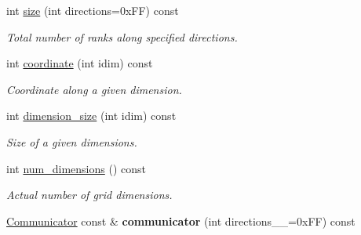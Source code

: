 \begin{DoxyCompactItemize}
\item 
int \hyperlink{classsddk_1_1_m_p_i__grid_a88ccf2c5e4ab458190651ec4164babeb}{size} (int directions=0x\+F\+F) const 
\begin{DoxyCompactList}\small\item\em Total number of ranks along specified directions. \end{DoxyCompactList}\item 
int \hyperlink{classsddk_1_1_m_p_i__grid_a97c43f2195fc1c4a553636a6e7c6fec4}{coordinate} (int idim) const 
\begin{DoxyCompactList}\small\item\em Coordinate along a given dimension. \end{DoxyCompactList}\item 
int \hyperlink{classsddk_1_1_m_p_i__grid_a863a454c69d052342a823ed001935872}{dimension\+\_\+size} (int idim) const 
\begin{DoxyCompactList}\small\item\em Size of a given dimensions. \end{DoxyCompactList}\item 
int \hyperlink{classsddk_1_1_m_p_i__grid_a9ecf6b5c10f2da5133a9c5fe9be9e15e}{num\+\_\+dimensions} () const 
\begin{DoxyCompactList}\small\item\em Actual number of grid dimensions. \end{DoxyCompactList}\item 
\hypertarget{classsddk_1_1_m_p_i__grid_a354d7dfc6cfc47220b412a746d2cdc68}{}\hyperlink{classsddk_1_1_communicator}{Communicator} const \& {\bfseries communicator} (int directions\+\_\+\+\_\+=0x\+F\+F) const \label{classsddk_1_1_m_p_i__grid_a354d7dfc6cfc47220b412a746d2cdc68}

\end{DoxyCompactItemize}
